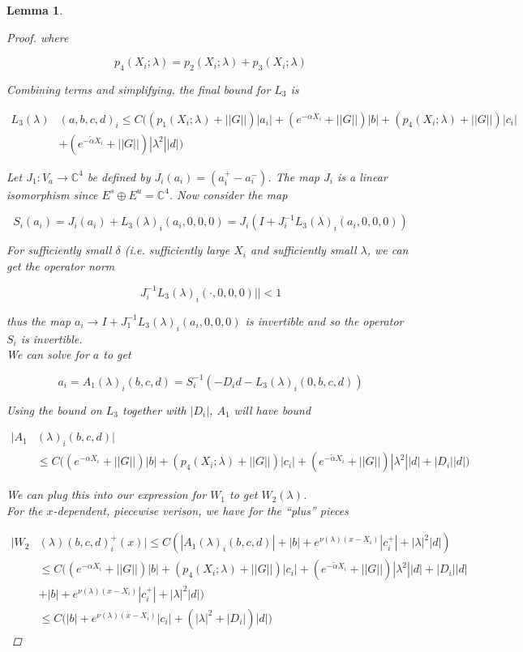\documentclass[12pt]{article}
\def\C{{\mathbb C}}
\newtheorem{lemma}{Lemma}
\begin{document}
\begin{lemma}
\begin{proof}
where

\[
p_4(X_i; \lambda) = p_2(X_i; \lambda) + p_3(X_i; \lambda)
\]

Combining terms and simplifying, the final bound for $L_3$ is

\begin{align*}
L_3(\lambda)&(a, b, c, d)_i \leq C \Big( (p_1(X_i; \lambda) + ||G|| )|a_i|
+ (e^{-\alpha X_i} + ||G||)|b| + ( p_4(X_i; \lambda) + ||G|| )|c_i| \\
&+ (e^{-\tilde{\alpha} X_i} + ||G||) |\lambda^2| |d| \Big)
\end{align*}

Let $J_1: V_a \rightarrow \C^4$ be defined by $J_i(a_i) = (a_i^+ - a_i^-)$. The map $J_i$ is a linear isomorphism since $E^s \oplus E^u = \C^4$. Now consider the map

\[
S_i(a_i) = J_i (a_i) + L_3(\lambda)_i(a_i, 0, 0, 0) = J_i( I + J_i^{-1} L_3(\lambda)_i(a_i, 0, 0, 0))
\]

For sufficiently small $\delta$ (i.e. sufficiently large $X_i$ and sufficiently small $\lambda$, we can get the operator norm 

\[
J_i^{-1} L_3(\lambda)_i(\cdot, 0, 0, 0)|| < 1
\]

thus the map $a_i \rightarrow I + J_1^{-1} L_3(\lambda)_i(a_i, 0, 0, 0)$ is invertible and so the operator $S_i$ is invertible.\\

We can solve for $a$ to get

\[
a_i = A_1(\lambda)_i(b, c, d) = S_i^{-1}(-D_i d - L_3(\lambda)_i(0, b, c, d))
\]

Using the bound on $L_3$ together with $|D_i|$, $A_1$ will have bound

\begin{align*}
|A_1&(\lambda)_i(b, c, d)| \\
&\leq C \Big( (e^{-\alpha X_i} + ||G||) |b| + ( p_4(X_i; \lambda) + ||G|| )|c_i|
+ (e^{-\tilde{\alpha} X_i} + ||G||) |\lambda^2| |d| + |D_i||d| \Big)
\end{align*} 

We can plug this into our expression for $W_1$ to get $W_2(\lambda)$.\\

For the $x$-dependent, piecewise verison, we have for the ``plus'' pieces

\begin{align*}
|W_2&(\lambda)(b,c,d)_i^+(x)| \leq C ( |A_1(\lambda)_i(b, c, d)| + |b| + e^{\nu(\lambda)(x - X_i)}|c_i^+| + |\lambda|^2 |d| ) \\
&\leq C \Big( (e^{-\alpha X_i} + ||G||)|b| + ( p_4(X_i; \lambda) + ||G|| )|c_i|
+ (e^{-\tilde{\alpha} X_i} + ||G||) |\lambda^2| |d| + |D_i||d| \\
&+ |b| + e^{\nu(\lambda)(x - X_i)}|c_i^+| + |\lambda|^2 |d| \Big)\\
&\leq C \Big( |b| + e^{\nu(\lambda)(x - X_i)}|c_i| + (|\lambda|^2 + |D_i|)|d| \Big)
\end{align*}


\end{proof}
\end{lemma}
\end{document}
